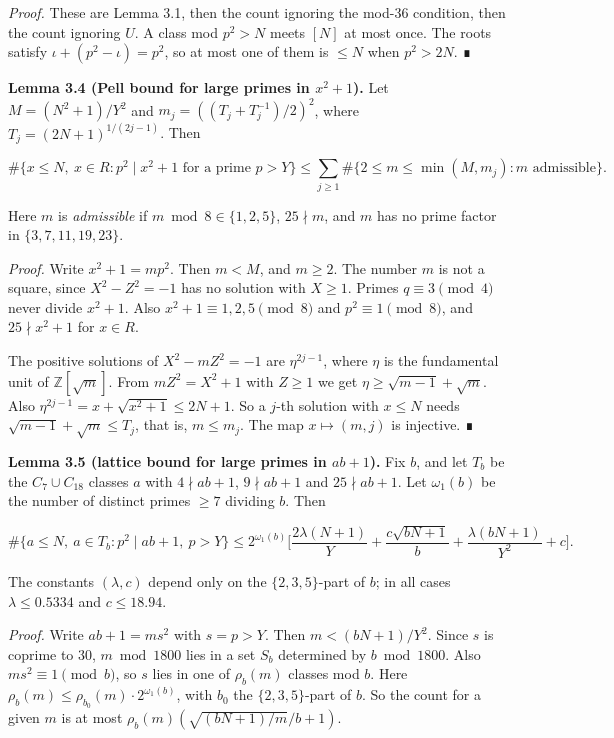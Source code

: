 \documentclass[
  11pt,
]{article}
\begin{document}
\emph{Proof.} These are Lemma 3.1, then the count ignoring the mod-36
condition, then the count ignoring \(U\). A class mod \(p^2 > N\) meets
\([N]\) at most once. The roots satisfy \(\iota + (p^2 - \iota) = p^2\),
so at most one of them is \(\le N\) when \(p^2 > 2N\). ∎

\textbf{Lemma 3.4 (Pell bound for large primes in \(x^2 + 1\)).} Let
\(M = (N^2 + 1)/Y^2\) and \(m_j = ((T_j + T_j^{-1})/2)^2\), where
\(T_j = (2N + 1)^{1/(2j-1)}\). Then

\[\#\{x \le N,\ x\in R : p^2 \mid x^2+1 \text{ for a prime } p>Y\} \le \sum_{j\ge1} \#\{2\le m\le \min(M,m_j) : m \text{ admissible}\}.\]

Here \(m\) is \emph{admissible} if \(m \bmod 8 \in \{1, 2, 5\}\),
\(25 \nmid m\), and \(m\) has no prime factor in
\(\{3, 7, 11, 19, 23\}\).

\emph{Proof.} Write \(x^2 + 1 = mp^2\). Then \(m < M\), and \(m \ge 2\).
The number \(m\) is not a square, since \(X^2 - Z^2 = -1\) has no
solution with \(X \ge 1\). Primes \(q \equiv 3 \pmod{4}\) never divide
\(x^2 + 1\). Also \(x^2 + 1 \equiv 1, 2, 5 \pmod{8}\) and
\(p^2 \equiv 1 \pmod{8}\), and \(25 \nmid x^2 + 1\) for \(x \in R\).

The positive solutions of \(X^2 - mZ^2 = -1\) are \(\eta^{2j-1}\), where
\(\eta\) is the fundamental unit of \(\mathbb{Z}[\sqrt{m}]\). From
\(mZ^2 = X^2 + 1\) with \(Z \ge 1\) we get
\(\eta \ge \sqrt{m-1} + \sqrt{m}\). Also
\(\eta^{2j-1} = x + \sqrt{x^2+1} \le 2N + 1\). So a \(j\)-th solution
with \(x \le N\) needs \(\sqrt{m-1} + \sqrt{m} \le T_j\), that is,
\(m \le m_j\). The map \(x \mapsto (m, j)\) is injective. ∎

\textbf{Lemma 3.5 (lattice bound for large primes in \(ab + 1\)).} Fix
\(b\), and let \(T_b\) be the \(C_7 \cup C_{18}\) classes \(a\) with
\(4 \nmid ab + 1\), \(9 \nmid ab + 1\) and \(25 \nmid ab + 1\). Let
\(\omega_1(b)\) be the number of distinct primes \(\ge 7\) dividing
\(b\). Then

\[\#\{a\le N,\ a\in T_b : p^2\mid ab+1,\ p>Y\} \le 2^{\omega_1(b)}\Big[\frac{2\lambda(N+1)}{Y} + \frac{c\sqrt{bN+1}}{b} + \frac{\lambda(bN+1)}{Y^2} + c\Big].\]

The constants \((\lambda, c)\) depend only on the \(\{2, 3, 5\}\)-part
of \(b\); in all cases \(\lambda \le 0.5334\) and \(c \le 18.94\).

\emph{Proof.} Write \(ab + 1 = ms^2\) with \(s = p > Y\). Then
\(m < (bN + 1)/Y^2\). Since \(s\) is coprime to \(30\), \(m \bmod 1800\)
lies in a set \(S_b\) determined by \(b \bmod 1800\). Also
\(ms^2 \equiv 1 \pmod{b}\), so \(s\) lies in one of \(\rho_b(m)\)
classes mod \(b\). Here
\(\rho_b(m) \le \rho_{b_0}(m)\cdot 2^{\omega_1(b)}\), with \(b_0\) the
\(\{2, 3, 5\}\)-part of \(b\). So the count for a given \(m\) is at most
\(\rho_b(m)(\sqrt{(bN+1)/m}/b + 1)\).
\end{document}
